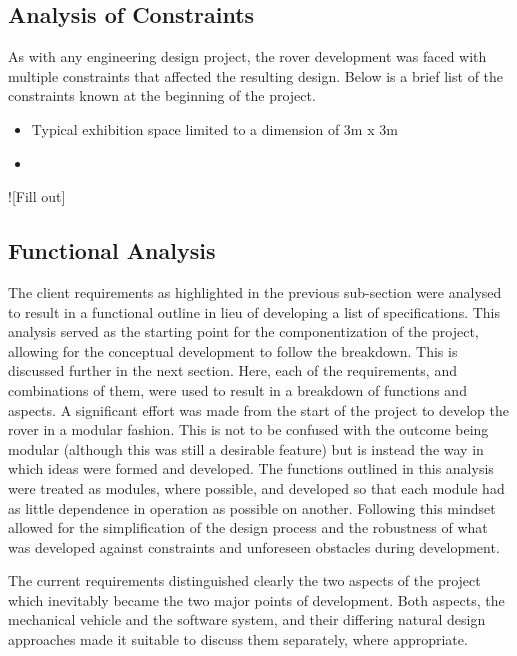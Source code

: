   \subsection{Analysis of Constraints}
    As with any engineering design project, the rover development was faced with multiple constraints that affected the resulting design. Below is a brief list of the constraints known at the beginning of the project.
    
    \begin{itemize}
      \item Typical exhibition space limited to a dimension of 3m x 3m
      \item 
    \end{itemize}
    
    ![Fill out]
    
  \subsection{Functional Analysis}
    The client requirements as highlighted in the previous sub-section were analysed to result in a functional outline in lieu of developing a list of specifications. This analysis served as the starting point for the componentization of the project, allowing for the conceptual development to follow the breakdown. This is discussed further in the next section. Here, each of the requirements, and combinations of them, were used to result in a breakdown of functions and aspects. A significant effort was made from the start of the project to develop the rover in a modular fashion. This is not to be confused with the outcome being modular (although this was still a desirable feature) but is instead the way in which ideas were formed and developed. The functions outlined in this analysis were treated as modules, where possible, and developed so that each module had as little dependence in operation as possible on another. Following this mindset allowed for the simplification of the design process and the robustness of what was developed against constraints and unforeseen obstacles during development.
    
    The current requirements distinguished clearly the two aspects of the project which inevitably became the two major points of development. Both aspects, the mechanical vehicle and the software system, and their differing natural design approaches made it suitable to discuss them separately, where appropriate.
    

